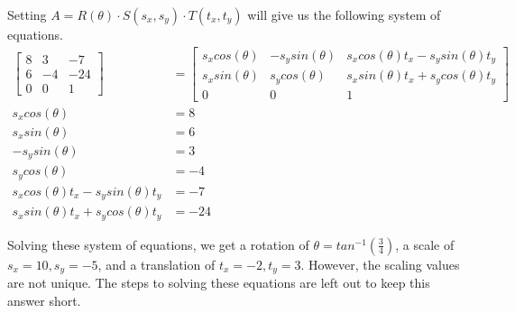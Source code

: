 \documentclass{article} %
\begin{document}
Setting $A = R(\theta) \cdot S(s_x, s_y) \cdot T(t_x, t_y)$ will give us the following system of equations.
\begin{align*}
\left[
\begin{matrix}
8 & 3 & -7\\
6 & -4 & -24\\
0 & 0 & 1
\end{matrix}
\right]
&=
\left[
\begin{matrix}
s_x cos(\theta) & - s_y sin(\theta) & s_x cos(\theta) t_x - s_y sin(\theta) t_y\\
s_x sin(\theta) & s_y cos(\theta) & s_x sin(\theta) t_x + s_y cos(\theta) t_y\\
0 & 0 & 1
\end{matrix}
\right]\\
s_x cos(\theta) &= 8\\
s_x sin(\theta) &= 6\\
- s_y sin(\theta) &= 3\\
s_y cos(\theta) &= -4\\
s_x cos(\theta) t_x - s_y sin(\theta) t_y &= -7\\
s_x sin(\theta) t_x + s_y cos(\theta) t_y &= -24
\end{align*}

Solving these system of equations, we get a rotation of $\theta = tan^{-1}(\frac{3}{4})$, a scale of $s_x=10, s_y=-5$, and a translation of $t_x=-2, t_y=3$. However, the scaling values are not unique. The steps to solving these equations are left out to keep this answer short.
\end{document}
